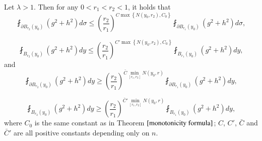\documentclass[a4paper, 12pt, onecolumn]{article} \textwidth 148mm
\begin{document}
\begin{lemma}\label{doubling condition for both u and v}
Let $\lambda>1$. Then for any $0<r_1<r_2<1$, it holds that
\begin{equation}\label{first doubling condition}
\fint_{\partial B_{r_2}(y_0)}(g^2+h^2)d\sigma
\leq\left(\frac{r_2}{r_1}\right)^{C\max\left\{N(y_0,r_2), C_0\right\}}
\fint_{\partial B_{r_1}(y_0)}(g^2+h^2)d\sigma,
\end{equation}

\begin{equation}\label{second doubling condition}
\fint_{B_{r_2}(y_0)}(g^2+h^2)dy
\leq\left(\frac{r_2}{r_1}\right)^{C'\max\left\{N(y_0,r_2), C_0\right\}}
\fint_{B_{r_1}(y_0)}(g^2+h^2)dy,
\end{equation}
and
\begin{equation}\label{third doubling condition}
\fint_{\partial B_{r_2}(y_0)}(g^2+h^2)dy
\geq\left(\frac{r_2}{r_1}\right)^{\bar{C}\min\limits_{[r_1,r_2]}
N(y_0,r)}\fint_{\partial B_{r_1}(y_0)}(g^2+h^2)dy,
\end{equation}

\begin{equation}\label{fourth doubling condition}
\fint_{B_{r_2}(y_0)}(g^2+h^2)dy\geq
\left(\frac{r_2}{r_1}\right)^{\bar{C}'\min\limits_{[r_1,r_2]}N(y_0,r)}
\fint_{B_{r_1}(y_0)}(g^2+h^2)dy,
\end{equation}
where $C_0$ is the same constant as in Theorem $\ref{monotonicity formula}$; $C$, $C'$, $\bar{C}$ and $\bar{C}'$ are all positive constants depending only on $n$.
\end{lemma}
\end{document}
